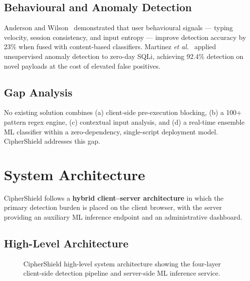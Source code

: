 \documentclass[10pt, twocolumn]{article}
\begin{document}
\subsection{Behavioural and Anomaly Detection}

Anderson and Wilson~\cite{anderson2025} demonstrated that user behavioural 
signals --- typing velocity, session consistency, and input entropy --- improve 
detection accuracy by 23\% when fused with content-based classifiers. 
Martinez \textit{et al.}~\cite{martinez2025} applied unsupervised anomaly 
detection to zero-day SQLi, achieving 92.4\% detection on novel payloads 
at the cost of elevated false positives.

\subsection{Gap Analysis}

No existing solution combines (a) client-side pre-execution blocking, 
(b) a 100+ pattern regex engine, (c) contextual input analysis, and 
(d) a real-time ensemble ML classifier within a zero-dependency, single-script 
deployment model. CipherShield addresses this gap.

\section{System Architecture}
\label{sec:arch}

CipherShield follows a \textbf{hybrid client--server architecture} in which 
the primary detection burden is placed on the client browser, with the 
server providing an auxiliary ML inference endpoint and an administrative 
dashboard.

\subsection{High-Level Architecture}

\begin{figure}[H]
  \centering
  \caption{CipherShield high-level system architecture showing the four-layer 
           client-side detection pipeline and server-side ML inference service.}
  \label{fig:arch}
\end{figure}
\end{document}
